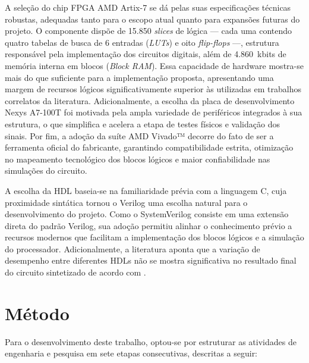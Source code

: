 A seleção do chip FPGA AMD Artix-7 se dá pelas suas especificações técnicas robustas, adequadas tanto para o escopo atual quanto para expansões futuras do projeto. O componente dispõe de 15.850 \textit{slices} de lógica — cada uma contendo quatro tabelas de busca de 6 entradas (\textit{LUTs}) e oito \textit{flip-flops} —, estrutura responsável pela implementação dos circuitos digitais, além de 4.860~kbits de memória interna em blocos (\textit{Block RAM}). Essa capacidade de hardware mostra-se mais do que suficiente para a implementação proposta, apresentando uma margem de recursos lógicos significativamente superior às utilizadas em trabalhos correlatos da literatura. Adicionalmente, a escolha da placa de desenvolvimento Nexys A7-100T foi motivada pela ampla variedade de periféricos integrados à sua estrutura, o que simplifica e acelera a etapa de testes físicos e validação dos sinais. Por fim, a adoção da suíte AMD Vivado™ decorre do fato de ser a ferramenta oficial do fabricante, garantindo compatibilidade estrita, otimização no mapeamento tecnológico dos blocos lógicos e maior confiabilidade nas simulações do circuito.

A escolha da HDL baseia-se na familiaridade prévia com a linguagem C, cuja proximidade sintática tornou o Verilog uma escolha natural para o desenvolvimento do projeto. Como o SystemVerilog consiste em uma extensão direta do padrão Verilog, sua adoção permitiu alinhar o conhecimento prévio a recursos modernos que facilitam a implementação dos blocos lógicos e a simulação do processador. Adicionalmente, a literatura aponta que a variação de desempenho entre diferentes HDLs não se mostra significativa no resultado final do circuito sintetizado de acordo com .

\section{Método}
\label{sec:metodo}

Para o desenvolvimento deste trabalho, optou-se por estruturar as atividades de engenharia e pesquisa em sete etapas consecutivas, descritas a seguir:

